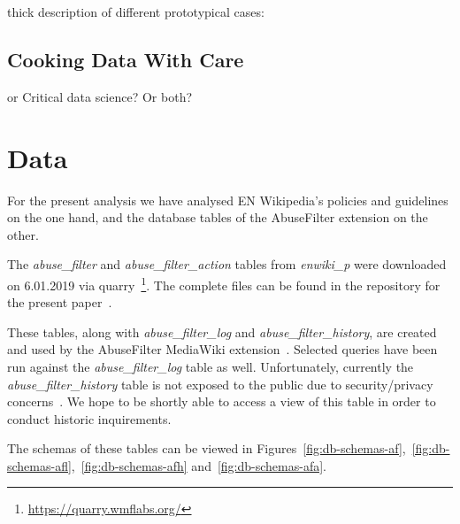 \documentclass{sigchi}
\begin{document}
thick description of different prototypical cases:

\subsection{Cooking Data With Care}
or Critical data science? Or both?


\section{Data}

For the present analysis we have analysed EN Wikipedia's policies and guidelines on the one hand, and the database tables of the AbuseFilter extension on the other.

The \emph{abuse\_filter} and \emph{abuse\_filter\_action} tables from \emph{enwiki\_p} were downloaded on 6.01.2019 via quarry~\footnote{\url{https://quarry.wmflabs.org/}}.
The complete files can be found in the repository for the present paper~\cite{github}. %

These tables, along with \emph{abuse\_filter\_log} and \emph{abuse\_filter\_history}, are created and used by the AbuseFilter MediaWiki extension~\cite{gerrit-abusefilter}.
Selected queries have been run against the \emph{abuse\_filter\_log} table as well.
Unfortunately, currently the \emph{abuse\_filter\_history} table is not exposed to the public due to security/privacy concerns~\cite{phabricator}.
We hope to be shortly able to access a view of this table in order to conduct historic inquirements.

The schemas of these tables can be viewed in Figures~\ref{fig:db-schemas-af},~\ref{fig:db-schemas-afl},~\ref{fig:db-schemas-afh} and~\ref{fig:db-schemas-afa}.
\end{document}
